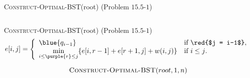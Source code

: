 
\begin{frame}
  \begin{exampleblock}{\textsc{Construct-Optimal-BST}(root) (Problem $15.5$-$1$)}
    \begin{columns}
    \end{columns}
  \end{exampleblock}

  \pause
  \vspace{0.30cm}
  \begin{center}
  \end{center}
\end{frame}

\begin{frame}
  \begin{exampleblock}{\textsc{Construct-Optimal-BST}(root) (Problem $15.5$-$1$)}
    \[ 
      e[i,j] = \left\{ \begin{array}{ll}
	\blue{q_{i-1}} 	& \mbox{if \red{$j = i-1$}}, \\
	\min\limits_{i \le \purple{r} \le j} \{e[i, r-1] + e[r+1, j] + w(i,j) \}    & \mbox{if $i \le j$}.
      \end{array} \right. 
    \] 
  \end{exampleblock}

  \pause
  

  \pause
  \vspace{-0.50cm}
  \[
    \textsc{Construct-Optimal-BST}(root, 1, n)
  \]
\end{frame}

\begin{frame}
\end{frame}

\begin{frame}
  
\end{frame}
